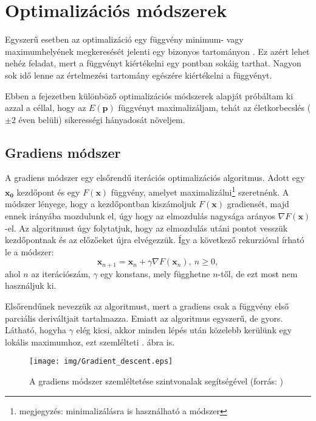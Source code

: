 \documentclass[12pt]{article}
\begin{document}
\section{Optimalizációs módszerek}
Egyszerű esetben az optimalizáció egy függvény minimum- vagy maximumhelyének megkeresését jelenti egy bizonyos tartományon \cite{Holder}. Ez azért lehet nehéz feladat, mert a függvényt kiértékelni egy pontban sokáig tarthat. Nagyon sok idő lenne az értelmezési tartomány egészére kiértékelni a függvényt.

Ebben a fejezetben különböző optimalizációs módszerek alapját próbáltam ki azzal a céllal, hogy az $E(\mathbf{p})$ függvényt maximalizáljam, tehát az életkorbecslés ($\pm 2$ éven belüli) sikerességi hányadosát növeljem.
\subsection{Gradiens módszer}
A gradiens módszer \cite{gradient1, gradient2} egy elsőrendű iterációs optimalizációs algoritmus. Adott egy $\mathbf{x_0}$ kezdőpont és egy $F(\mathbf{x})$ függvény, amelyet maximalizálni\footnote{megjegyzés: minimalizálásra is használható a módszer} szeretnénk. A módszer lényege, hogy a kezdőpontban kiszámoljuk $F(\mathbf{x})$ gradiensét, majd ennek irányába mozdulunk el, úgy hogy az elmozdulás nagysága arányos $\nabla F(\mathbf{x})$-el.
Az algoritmust úgy folytatjuk, hogy az elmozdulás utáni pontot vesszük kezdőpontnak és az előzőeket újra elvégezzük.
Így a következő rekurzióval írható le a módszer:
\begin{equation}
	\mathbf {x}_{n+1}=\mathbf {x}_{n}+\gamma\nabla F(\mathbf {x}_{n}),\ n\geq 0,
\end{equation}
ahol $n$ az iterációszám, $\gamma$ egy konstans, mely függhetne $n$-től, de ezt most nem használjuk ki. 

Elsőrendűnek nevezzük az algoritmust, mert a gradiens csak a függvény első parciális deriváltjait tartalmazza. Emiatt az algoritmus egyszerű, de gyors. Látható, hogyha $\gamma$ elég kicsi, akkor minden lépés után közelebb kerülünk egy lokális maximumhoz, ezt szemlélteti . ábra is.
\begin{figure}[H]
	\centering
	\texttt{[image: img/Gradient\_descent.eps]}
	\caption{A gradiens módszer szemléltetése szintvonalak segítségével (forrás: \cite{grad_wiki})}
	\label{grad_contour}
\end{figure}
\end{document}
